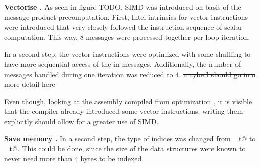 \documentclass[letterpaper]{article}
\newcommand{\mypar}[1]{{\bf #1.}}
\begin{document}
\mypar{Vectorise }
As seen in figure TODO, SIMD was introduced on basis of the message product precomputation. First, Intel intrinsics for vector instructions were introduced that very closely followed the instruction sequence of scalar computation. This way, 8 messages were processed together per loop iteration.

In a second step, the vector instructions were optimized with some shuffling to have more sequential access of the in-messages. Additionally, the number of messages handled during one iteration was reduced to 4. \st{maybe I should go into more detail here}

Even though, looking at the assembly compiled from optimization , it is visible that the compiler already introduced some vector instructions, writing them explicitly should allow for a greater use of SIMD.

\mypar{Save memory }
In a second step, the type of indices was changed from \verb@size_t@ to _t@. This could be done, since the size of the data structures were known to never need more than 4 bytes to be indexed.
\end{document}
